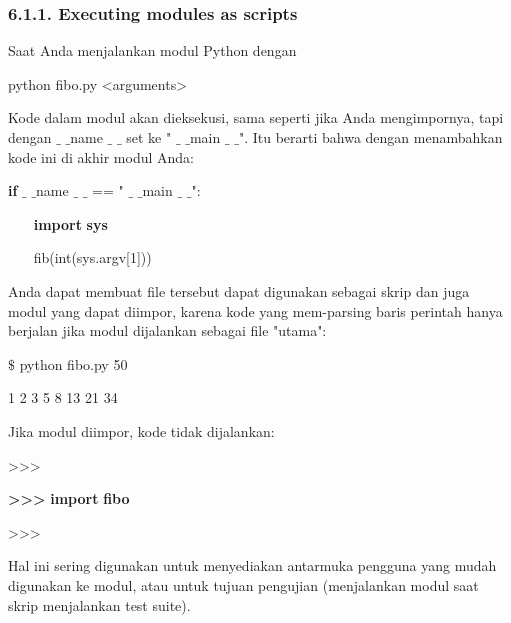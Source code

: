 \documentclass[a4paper,12pt]{report}
\begin{document}
\subsubsection*{6.1.1. Executing modules as scripts}
 \par
\noindent 
Saat Anda menjalankan modul Python dengan \par
\noindent 
python fibo.py <arguments> \par
\noindent 
Kode dalam modul akan dieksekusi, sama seperti jika Anda mengimpornya, tapi dengan  $  \_  $ $  \_  $name $  \_  $ $  \_  $ set ke " $  \_  $ $  \_  $main $  \_  $ $  \_  $". Itu berarti bahwa dengan menambahkan kode ini di akhir modul Anda: \par
\noindent 
\textbf{if}  $  \_  $ $  \_  $name $  \_  $ $  \_  $ == " $  \_  $ $  \_  $main $  \_  $ $  \_  $": \par
\noindent 
~~~ \textbf{import} \textbf{sys} \par
\noindent 
~~~ fib(int(sys.argv[1])) \par
\noindent 
Anda dapat membuat file tersebut dapat digunakan sebagai skrip dan juga modul yang dapat diimpor, karena kode yang mem-parsing baris perintah hanya berjalan jika modul dijalankan sebagai file "utama": \par
\noindent 
\textbf{ $  \$  $} python fibo.py 50 \par
{} 1 2 3 5 8 13 21 34 \par
\noindent 
Jika modul diimpor, kode tidak dijalankan: \par
\noindent 
>>> \par
\noindent 
\textbf{>>> }\textbf{import} \textbf{fibo} \par
\noindent 
>>> \par
\noindent 
Hal ini sering digunakan untuk menyediakan antarmuka pengguna yang mudah digunakan ke modul, atau untuk tujuan pengujian (menjalankan modul saat skrip menjalankan test suite). \par
\vspace{12pt}
\noindent 
\end{document}
